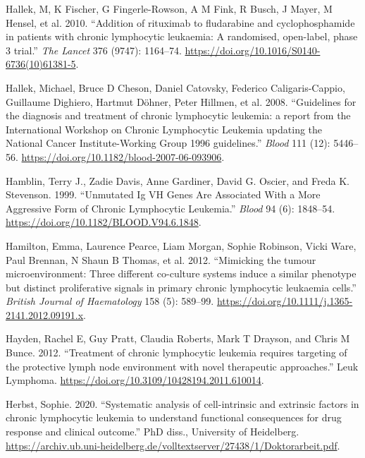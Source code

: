 \documentclass[11pt, a4paper, twosided]{book}
\newenvironment{CSLReferences}%
  {}%
  {\par}
\begin{document}
\begin{CSLReferences}{1}{0}
\leavevmode{}%
Hallek, M, K Fischer, G Fingerle-Rowson, A M Fink, R Busch, J Mayer, M Hensel, et al. 2010. {``{Addition of rituximab to fludarabine and cyclophosphamide in patients with chronic lymphocytic leukaemia: A randomised, open-label, phase 3 trial}.''} \emph{The Lancet} 376 (9747): 1164--74. \url{https://doi.org/10.1016/S0140-6736(10)61381-5}.

\leavevmode{}%
Hallek, Michael, Bruce D Cheson, Daniel Catovsky, Federico Caligaris-Cappio, Guillaume Dighiero, Hartmut Döhner, Peter Hillmen, et al. 2008. {``{Guidelines for the diagnosis and treatment of chronic lymphocytic leukemia: a report from the International Workshop on Chronic Lymphocytic Leukemia updating the National Cancer Institute-Working Group 1996 guidelines.}''} \emph{Blood} 111 (12): 5446--56. \url{https://doi.org/10.1182/blood-2007-06-093906}.

\leavevmode{}%
Hamblin, Terry J., Zadie Davis, Anne Gardiner, David G. Oscier, and Freda K. Stevenson. 1999. {``{Unmutated Ig VH Genes Are Associated With a More Aggressive Form of Chronic Lymphocytic Leukemia}.''} \emph{Blood} 94 (6): 1848--54. \url{https://doi.org/10.1182/BLOOD.V94.6.1848}.

\leavevmode{}%
Hamilton, Emma, Laurence Pearce, Liam Morgan, Sophie Robinson, Vicki Ware, Paul Brennan, N Shaun B Thomas, et al. 2012. {``{Mimicking the tumour microenvironment: Three different co-culture systems induce a similar phenotype but distinct proliferative signals in primary chronic lymphocytic leukaemia cells}.''} \emph{British Journal of Haematology} 158 (5): 589--99. \url{https://doi.org/10.1111/j.1365-2141.2012.09191.x}.

\leavevmode{}%
Hayden, Rachel E, Guy Pratt, Claudia Roberts, Mark T Drayson, and Chris M Bunce. 2012. {``{Treatment of chronic lymphocytic leukemia requires targeting of the protective lymph node environment with novel therapeutic approaches}.''} Leuk Lymphoma. \url{https://doi.org/10.3109/10428194.2011.610014}.

\leavevmode{}%
Herbst, Sophie. 2020. {``{Systematic analysis of cell-intrinsic and extrinsic factors in chronic lymphocytic leukemia to understand functional consequences for drug response and clinical outcome}.''} PhD diss., University of Heidelberg. \url{https://archiv.ub.uni-heidelberg.de/volltextserver/27438/1/Doktorarbeit.pdf}.


\end{CSLReferences}
\end{document}
